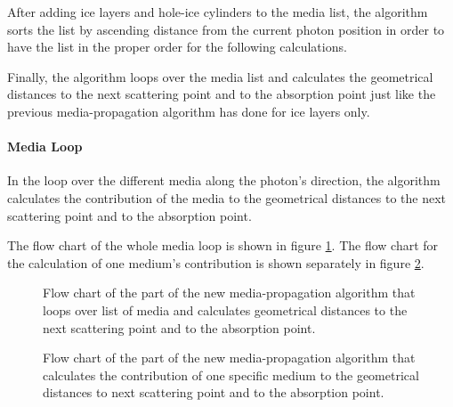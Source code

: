 After adding ice layers and hole-ice cylinders to the media list, the algorithm sorts the list by ascending distance from the current photon position in order to have the list in the proper order for the following calculations.

Finally, the algorithm loops over the media list and calculates the geometrical distances to the next scattering point and to the absorption point just like the previous media-propagation algorithm has done for ice layers only.


\paragraph{Media Loop}
In the loop over the different media along the photon's direction, the algorithm calculates the contribution of the media to the geometrical distances to the next scattering point and to the absorption point.

The flow chart of the whole media loop is shown in figure \ref{fig:nimuriX4}. The flow chart for the calculation of one medium's contribution is shown separately in figure \ref{fig:eewoo3Be}.

\begin{figure}[htbp]
  \caption{Flow chart of the part of the new media-propagation algorithm that loops over list of media and calculates geometrical distances to the next scattering point and to the absorption point.}
  \label{fig:nimuriX4}
\end{figure}


\begin{figure}[htbp]
  \caption{Flow chart of the part of the new media-propagation algorithm that calculates the contribution of one specific medium to the geometrical distances to next scattering point and to the absorption point.}
  \label{fig:eewoo3Be}
\end{figure}

